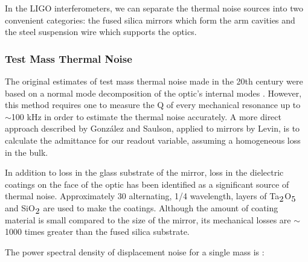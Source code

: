 In the LIGO interferometers, we can separate the thermal noise sources into two
convenient categories: the fused silica mirrors which form the arm 
cavities and the steel suspension wire which supports the optics.

\subsubsection{Test Mass Thermal Noise}

The original estimates of test mass thermal noise made in the 20th century were
based on a normal mode decomposition of the optic's internal modes 
\cite{Fred:Thermal}. However, this method requires one to measure the
Q of every mechanical resonance up to $\sim$100 kHz in order to 
estimate the thermal noise accurately. A more direct approach described
by Gonz\'alez and Saulson\cite{Gaby:Acoustic}, applied to mirrors by 
Levin\cite{Levin:Thermal}, is to calculate the admittance for our 
readout variable, assuming a homogeneous loss in the bulk.

In addition to loss in the glass substrate of the mirror, loss in the dielectric 
coatings on the face of the optic\cite{Andri:Coatings} has been identified
as a significant source of thermal noise. Approximately 30 
alternating, 1/4 wavelength, layers of Ta$_{\mbox 2}$O$_{\mbox 5}$ 
and SiO$_{\mbox 2}$ are used to make the coatings. Although the amount of coating
material is small compared to the size of the mirror, its mechanical losses
are $\sim$1000 times greater than the fused silica substrate. 

The power spectral density of displacement noise for 
a single mass is \cite{Andri:Coatings}:


